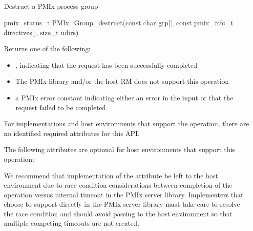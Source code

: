 \subsection{}

\summary

Destruct a \ac{PMIx} process group

\format

\cspecificstart
\begin{codepar}
pmix_status_t
PMIx_Group_destruct(const char grp[],
                    const pmix_info_t directives[], size_t ndirs)
\end{codepar}
\cspecificend

\begin{arglist}
\end{arglist}

Returns one of the following:

\begin{itemize}
    \item {}, indicating that the request has been successfully completed
    \item {} The \ac{PMIx} library and/or the host \ac{RM} does not support this operation
    \item a \ac{PMIx} error constant indicating either an error in the input or that the request failed to be completed
\end{itemize}

\reqattrstart
For implementations and host environments that support the operation, there are no identified required
attributes for this \ac{API}.
\reqattrend

\optattrstart
The following attributes are optional for host environments that support this operation:


\optattrend

\adviceimplstart
We recommend that implementation of the  attribute be left to the host environment due to race condition considerations between completion of the operation versus internal timeout in the \ac{PMIx} server library. Implementers that choose to support  directly in the \ac{PMIx} server library must take care to resolve the race condition and should avoid passing  to the host environment so that multiple competing timeouts are not created.
\adviceimplend


